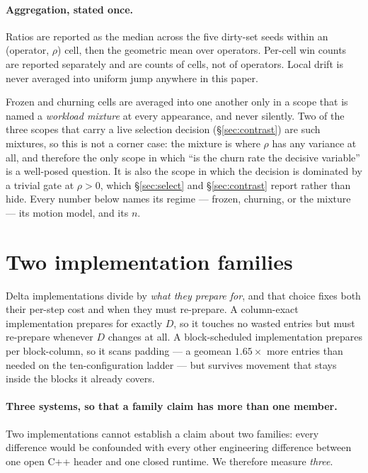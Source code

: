 \documentclass{article}
\begin{document}
\paragraph{Aggregation, stated once.}
Ratios are reported as the median across the five dirty-set seeds within an
(operator, $\rho$) cell, then the geometric mean over operators. Per-cell win
counts are reported separately and are counts of cells, not of operators. Local
drift is never averaged into uniform jump anywhere in this paper.

Frozen and churning cells are averaged into one another only in a scope that is
named a \emph{workload mixture} at every appearance, and never silently. Two of
the three scopes that carry a live selection decision (\S\ref{sec:contrast}) are
such mixtures, so this is not a corner case: the mixture is where $\rho$ has any
variance at all, and therefore the only scope in which ``is the churn rate the
decisive variable'' is a well-posed question. It is also the scope in which the
decision is dominated by a trivial gate at $\rho{>}0$, which
\S\ref{sec:select} and \S\ref{sec:contrast} report rather than hide. Every number
below names its regime --- frozen, churning, or the mixture --- its motion
model, and its $n$.

\section{Two implementation families}
\label{sec:families}

Delta implementations divide by \emph{what they prepare for}, and that choice
fixes both their per-step cost and when they must re-prepare. A column-exact
implementation prepares for exactly $D$, so it touches no wasted entries but must
re-prepare whenever $D$ changes at all. A block-scheduled implementation prepares
per block-column, so it scans padding --- a geomean $1.65\times$ more entries
than needed on the ten-configuration ladder --- but survives movement that stays
inside the blocks it already covers.

\paragraph{Three systems, so that a family claim has more than one member.}
Two implementations cannot establish a claim about two families: every
difference would be confounded with every other engineering difference between
one open C++ header and one closed runtime. We therefore measure \emph{three}.
\end{document}
